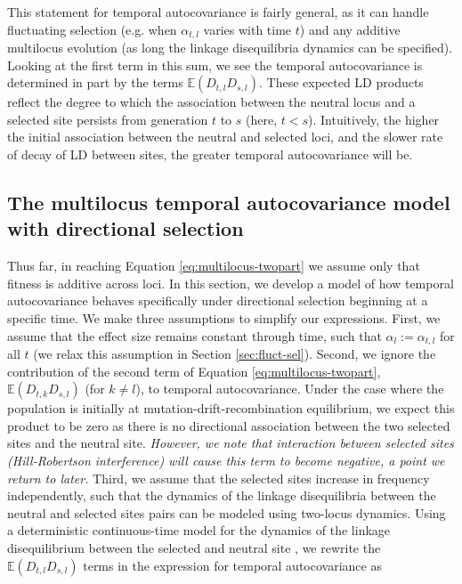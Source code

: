 \documentclass[11pt]{article}
\newcommand{\vb}[1]{{\it \color{blue} #1}}
\newcommand{\E}{\mathbb{E}}
\begin{document}
This statement for temporal autocovariance is fairly general, as it can handle
fluctuating selection (e.g. when $\alpha_{t,l}$ varies with time $t$) and any
additive multilocus evolution (as long the linkage disequilibria dynamics can
be specified). Looking at the first term in this sum, we see the temporal
autocovariance is determined in part by the terms $\E(D_{t,l} D_{s,l})$. These
expected LD products reflect the degree to which the association between the
neutral locus and a selected site persists from generation $t$ to $s$ (here, $t
< s$). Intuitively, the higher the initial association between the neutral and
selected loci, and the slower rate of decay of LD between sites, the greater
temporal autocovariance will be.

\subsection{The multilocus temporal autocovariance model with directional selection}
\label{sec:temp-autocov-dirsel}

Thus far, in reaching Equation \eqref{eq:multilocus-twopart} we assume only
that fitness is additive across loci. In this section, we develop a model of
how temporal autocovariance behaves specifically under directional selection
beginning at a specific time. We make three assumptions to simplify our
expressions. First, we assume that the effect size remains constant through
time, such that $\alpha_l := \alpha_{t,l}$ for all $t$ (we relax this
assumption in Section \ref{sec:fluct-sel}). Second, we ignore the contribution
of the second term of Equation \eqref{eq:multilocus-twopart}, $\E(D_{t,k}
D_{s,l})$ (for $k \ne l$), to temporal autocovariance. Under the case where the
population is initially at mutation-drift-recombination equilibrium, we expect
this product to be zero as there is no directional association between the two
selected sites and the neutral site. \vb{However, we note that interaction
between selected sites (Hill-Robertson interference) will cause this term to
become negative, a point we return to later.} Third, we assume that the
selected sites increase in frequency independently, such that the dynamics of
the linkage disequilibria between the neutral and selected sites pairs can be
modeled using two-locus dynamics. Using a deterministic continuous-time model
for the dynamics of the linkage disequilibrium between the selected and neutral
site \parencite{Maynard_Smith1974-lc,Barton2000-zg}, we rewrite the $\E(D_{t,l}
D_{s,l})$ terms in the expression for temporal autocovariance as
\end{document}
